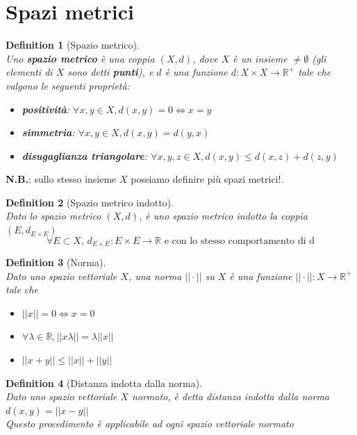 \documentclass{article}
\newtheorem{definition}{Definition}[section]
\begin{document}
\section{Spazi metrici}
    \begin{definition}[Spazio metrico] \, \\
        Uno \textbf{spazio metrico} è una coppia $\left(X, d\right)$, dove $X$ è un insieme $\neq \emptyset$
        (gli elementi di $X$ sono detti \textbf{punti}), e $d$ è una funzione $d: X \times X \rightarrow \mathbb{R}^+$ 
        tale che valgono le seguenti proprietà:
        \begin{itemize}
            \item \textbf{positività}: $\forall x, y \in X, d\left(x,y\right) = 0 \iff x = y$
            \item \textbf{simmetria}: $\forall x, y \in X, d\left(x, y\right) = d\left(y, x\right)$
            \item \textbf{disugaglianza triangolare}: $\forall x,y,z \in X, d\left(x, y\right) \leq d\left(x, z\right) + d\left(z, y\right)$
        \end{itemize}
    \end{definition}
    \textbf{N.B.}: sullo stesso insieme $X$ possiamo definire più spazi metrici!. \\
    \begin{definition}[Spazio metrico indotto] \, \\
        Dato lo spazio metrico $\left(X, d\right)$, è uno spazio metrico indotto la coppia $\left(E, d_{E \times E}\right)$
        $$\forall E \subset X, \, d_{E \times E}: E \times E \to \mathbb{R} \textrm{ e con lo stesso comportamento di d}$$
    \end{definition}
    \begin{definition}[Norma]\, \\
        Dato uno spazio vettoriale ${X}$, una norma $|| \cdot ||$ su $X$ è una funzione $|| \cdot ||: X \to \mathbb{R}^+$ tale che 
        \begin{itemize}
            \item $||x|| = 0 \iff x = 0$
            \item $\forall \lambda \in \mathbb{R}, ||x\lambda|| = \lambda||x||$
            \item $||x+y|| \leq ||x|| + ||y||$
        \end{itemize}
    \end{definition}
    \begin{definition}[Distanza indotta dalla norma]\, \\
        Dato uno spazio vettoriale $X$ normato, è detta distanza indotta dalla norma 
        $d\left(x,y\right) = ||x-y||$ \\
        Questo procedimento è applicabile ad ogni spazio vettoriale normato
    \end{definition}
\end{document}
